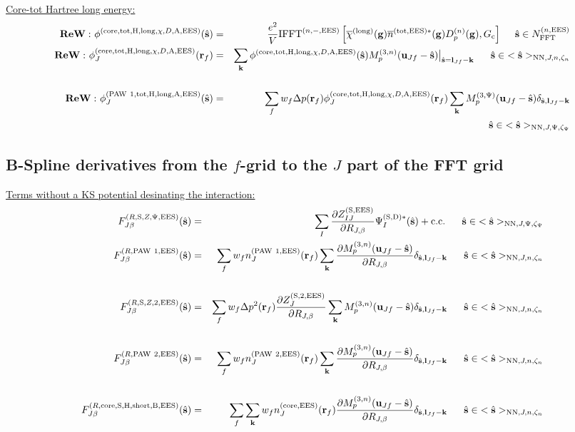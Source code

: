 \documentclass[paper=a4, fontsize=11pt]{article} %
\numberwithin{equation}{section} %
\numberwithin{figure}{section} %
\numberwithin{table}{section} %
\newcommand{\p}{\partial}
\newcommand{\ol}{\overline}
\newcommand{\bu}{{\bf{u}}}
\newcommand{\bl}{{\bf{l}}}
\newcommand{\bk}{{\bf{k}}}
\newcommand{\bs}{{\bf{s}}}
\newcommand{\bg}{{\bf{g}}}
\newcommand{\br}{{\bf{r}}}
\newcommand{\hs}{{\hat{\bf{s}}}}
\newcommand{\rS}{{\mathrm{S}}}
\newcommand{\rEES}{{\mathrm{EES}}}
\newcommand{\rcore}{{\mathrm{core}}}
\newcommand{\rNN}{{\mathrm{NN}}}
\newcommand{\rshort}{{\mathrm{short}}}
\newcommand{\rcc}{{\mathrm{c.c.}}}
\newcommand{\rlong}{{\mathrm{long}}}
\newcommand{\rP}{{\mathrm{PAW}}}
\newcommand{\rH}{{\mathrm{H}}}
\newcommand{\rA}{{\mathrm{A}}}
\newcommand{\rB}{{\mathrm{B}}}
\newcommand{\rD}{{\mathrm{D}}}
\newcommand{\rtot}{{\mathrm{tot}}}
\newcommand{\RJb}{{R_{J,\beta}}}
\newcommand{\NFFTnEES}{{N^{(n,\rEES)}_{\mathrm{FFT}}}}
\newcommand{\Gc}{{G_{\mathrm{c}}}}
\newcommand{\Mn}{{M_p^{(3,n)}}}
\newcommand{\Mp}{{M_p^{(3,\Psi)}}}
\newcommand{\IFFTniEES}{{\mathrm{IFFT}^{(n,-,\rEES)}}}
\newcommand{\hsJp}{{<\hs>_{\rNN,J,\Psi,\zeta_\Psi}}}
\newcommand{\hsJn}{{<\hs>_{\rNN,J,n,\zeta_n}}}
\newcommand{\hsinJp}{{\ \ \ \ \ \hs  \in  \hsJp}}
\newcommand{\hsinJn}{{\ \ \ \ \ \hs  \in  \hsJn}}
\newcommand{\hsinnEES}{{\ \ \ \ \hs \in \NFFTnEES}}
\newcommand{\ReW}{{{\bf ReW:\ }}}
\begin{document}
\underline{Core-tot Hartree long energy:}
\begin{eqnarray}
\ReW \phi^{(\rcore,\rtot,\rH,\rlong,\chi,D,\rA,\rEES)}(\hs)
&=&\frac{e^2}{V} \IFFTniEES \left[\ol \chi^{(\rlong)}(\bg)  \ol n^{(\rtot,\rEES)*}(\bg) D_p^{(n)}(\bg),\Gc\right] \hsinnEES \\
\label{ReWphi:fcoretotHlong}
\ReW \phi_J^{(\rcore,\rtot,\rH,\rlong,\chi,D,\rA,\rEES)}(\br_f) 
&=& \sum_{\bk} \phi^{(\rcore,\rtot,\rH,\rlong,\chi,D,\rA,\rEES)}(\hs) \Mn(\bu_{Jf}-\hat \bs) \big|_{\hat \bs=\bl_{Jf}-\bk} \hsinJn \nonumber\\ \\
\label{ReWphi:sPAW1titHlongA}
\ReW \phi_J^{(\rP\ 1,\rtot,\rH,\rlong,\rA,\rEES)}(\hs) &=& \sum_f w_f \Delta p(\br_f) \phi_J^{(\rcore,\rtot,\rH,\rlong,\chi,D,\rA,\rEES)}(\br_f)  \sum_{\bk} \Mp(\bu_{Jf}-\hat \bs) \delta_{\hat \bs,\bl_{Jf}-\bk} \nonumber\\
&& \hspace*{2.5in} \hsinJp 
\end{eqnarray}

\subsection{B-Spline derivatives from the $f$-grid to the $J$ part of the FFT grid}\label{BsplineR}

\underline{Terms without a KS potential desinating the interaction:}
\begin{eqnarray}
F_{J\beta}^{(R,\rS,Z,\Psi,\rEES)}(\hs) 
&=& \sum_I \frac{\p Z_{IJ}^{(\rS,\rEES)}}{\p \RJb}\Psi_I^{(\rS,\rD)*}(\hat \bs) + \rcc \hsinJp\\
\label{gr:FRPAW1}
F_{J\beta}^{(R,\rP\ 1,\rEES)}(\hs) &=& \sum_f w_f  n_J^{(\rP\ 1,\rEES)}(\br_f) \sum_{\bk}  \frac{\p \Mn(\bu_{Jf}-\hat \bs)}{\p \RJb}\delta_{\hat \bs,\bl_{Jf}-\bk} \hsinJn \nonumber\\ \\
\label{gr:FRSZ2}
F_{J\beta}^{(R,\rS,Z,2,\rEES)}(\hs) &=& \sum_f w_f  \Delta p^2(\br_f)\frac{\p Z_{J}^{(\rS,2,\rEES)}}{\p \RJb} \sum_{\bk}  \Mn(\bu_{Jf}-\hat \bs)\delta_{\hat \bs,\bl_{Jf}-\bk} \hsinJn \nonumber\\ \\
\label{gr:FRPAW2}
F_{J\beta}^{(R,\rP\ 2,\rEES)}(\hs) &=& \sum_f w_f  n_J^{(\rP\ 2,\rEES)}(\br_f) \sum_{\bk}  \frac{\p \Mn(\bu_{Jf}-\hat \bs)}{\p \RJb}\delta_{\hat \bs,\bl_{Jf}-\bk}\hsinJn \nonumber\\ \\
\label{gr:FRcoreSHshortB}
F_{J\beta}^{(R,\rcore,\rS,\rH,\rshort,\rB,\rEES)}(\hs)
&=&\sum_f \sum_{\bk}w_f  n_J^{(\rcore,\rEES)}(\br_f) \frac{\p \Mn(\bu_{Jf}-\hat \bs)}{\p \RJb}\delta_{\hat \bs,\bl_{Jf}-\bk} \hsinJn \nonumber\\
\end{eqnarray}
\end{document}
